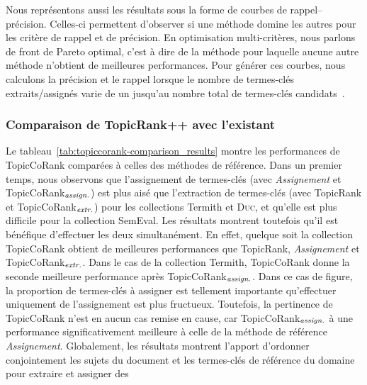         Nous représentons aussi les résultats sous la forme de courbes de
        rappel--précision. Celles-ci permettent d'observer si une méthode domine
        les autres pour les critère de rappel et de précision. En optimisation
        multi-critères, nous parlons de front de Pareto optimal, c'est à dire de
        la méthode pour laquelle aucune autre méthode n'obtient de meilleures
        performances. Pour générer ces courbes, nous calculons la précision et
        le rappel lorsque  le nombre de termes-clés extraits/assignés varie de
        un jusqu'au nombre total de termes-clés
        candidats~\cite{hassan2010conundrums}.
      
      \subsubsection{Comparaison de TopicRank++ avec l'existant}
      \label{subsubsec:main-domain_specific_keyphrase_annotation-supervised_automatic_keyphrase_annotation-evaluation-comparison}
        Le tableau~\ref{tab:topiccorank-comparison_results} montre les
        performances de TopicCoRank comparées à celles des méthodes de
        référence. Dans un premier temps, nous observons que l'assignement de
        termes-clés (avec \textit{Assignement} et
        TopicCoRank$_\textnormal{\textit{assign.}}$) est plus aisé que
        l'extraction de termes-clés (avec TopicRank et
        TopicCoRank$_\textnormal{\textit{extr.}}$) pour les collections Termith
        et \textsc{Duc}, et qu'elle est plus difficile pour la collection
        SemEval. Les résultats montrent toutefois qu'il est bénéfique
        d'effectuer les deux simultanément. En effet, quelque soit la collection
        TopicCoRank obtient de meilleures performances que TopicRank,
        \textit{Assignement} et TopicCoRank$_\textnormal{\textit{extr.}}$. Dans
        le cas de la collection Termith, TopicCoRank donne la seconde meilleure
        performance après TopicCoRank$_\textnormal{\textit{assign.}}$. Dans ce
        cas de figure, la proportion de termes-clés \og{}à assigner\fg{} est
        tellement importante qu'effectuer uniquement de l'assignement est plus
        fructueux. Toutefois, la pertinence de TopicCoRank n'est en aucun cas
        remise en cause, car TopicCoRank$_\textnormal{\textit{assign.}}$ à une
        performance significativement meilleure à celle de la méthode de
        référence \textit{Assignement}. Globalement, les résultats montrent
        l'apport d'ordonner conjointement les sujets du document et les
        termes-clés de référence du domaine pour extraire et assigner des
